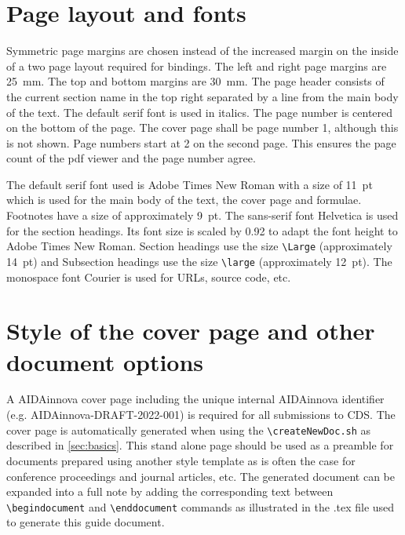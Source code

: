 \section{Page layout and fonts}
\label{sec:layout}
Symmetric page margins are chosen instead of the increased margin on the inside of a two page layout required for bindings. The left and right page margins are \SI{25}{\mm}. The top and bottom margins are \SI{30}{\mm}. The page header consists of the current section name in the top right separated by a line from the main body of the text. The default serif font is used in italics. The page number is centered on the bottom of the page. The cover page shall be page number 1, although this is not shown. Page numbers start at 2 on the second page. This ensures the page count of the pdf viewer and the page number agree.

The default serif font used is Adobe Times New Roman with a size of \SI{11}{pt} which is used for the main body of the text, the cover page and formulae. Footnotes have a size of approximately \SI{9}{pt}. The sans-serif font Helvetica is used for the section headings. Its font size is scaled by \num{0.92} to adapt the font height to Adobe Times New Roman. Section headings use the size \texttt{\textbackslash Large} (approximately \SI{14}{pt}) and Subsection headings use the size \texttt{\textbackslash large} (approximately \SI{12}{pt}). The monospace font Courier is used for URLs, source code, etc.

\section{Style of the cover page and other document options}
\label{sec:title}
A AIDAinnova cover page including the unique internal AIDAinnova identifier (e.g. AIDAinnova-DRAFT-2022-001) is required for all submissions to CDS. The cover page is automatically generated when using the \texttt{\textbackslash createNewDoc.sh} as described in \cref{sec:basics}. This stand alone page should be used as a preamble for documents prepared using another style template as is often the case for conference proceedings and journal articles, etc. The generated document can be expanded into a full note by adding the corresponding text between \texttt{\textbackslash begin{document}} and \texttt{\textbackslash end{document}} commands as illustrated in the .tex file used to generate this guide document.

